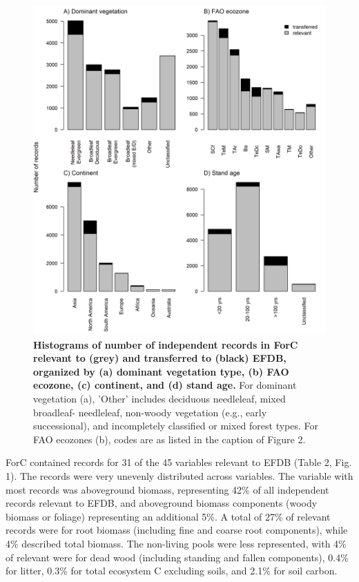 \documentclass[, manuscript]{copernicus}
\begin{document}
\newpage
\begin{figure}
\includegraphics[width=15cm]{figures_tables/Histogram_n_Relevant_and_Transferred_Records} \caption{\textbf{Histograms of number of independent records in ForC relevant to (grey) and transferred to (black) EFDB, organized by (a) dominant vegetation type, (b) FAO ecozone, (c) continent, and (d) stand age.} For dominant vegetation (a), 'Other' includes deciduous needleleaf, mixed broadleaf- needleleaf, non-woody vegetation (e.g., early successional), and incompletely classified or mixed forest types. For FAO ecozones (b), codes are as listed in the caption of Figure 2.}\label{fig:fig_histograms}
\end{figure}

ForC contained records for 31 of the 45 variables relevant to EFDB
(Table 2, Fig. 1). The records were very unevenly distributed across
variables. The variable with most records was aboveground biomass,
representing 42\% of all independent records relevant to EFDB, and
aboveground biomass components (woody biomass or foliage) representing
an additional 5\%. A total of 27\% of relevant records were for root
biomass (including fine and coarse root components), while 4\% described
total biomass. The non-living pools were less represented, with 4\% of
relevant were for dead wood (including standing and fallen components),
0.4\% for litter, 0.3\% for total ecosystem C excluding soils, and 2.1\%
for soil carbon.
\end{document}
